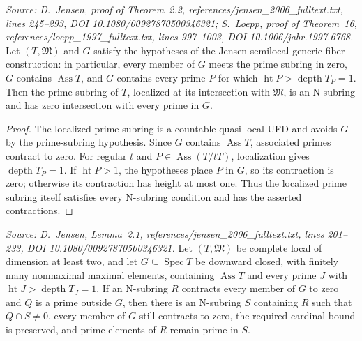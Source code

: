 \begin{lemma}
  \label{lem:initial_n_subring}
  \textit{Source: D.~Jensen, proof of Theorem~2.2,
  references/jensen\_2006\_fulltext.txt, lines 245--293,
  DOI 10.1080/00927870500346321; S.~Loepp, proof of Theorem~16,
  references/loepp\_1997\_fulltext.txt, lines 997--1003,
  DOI 10.1006/jabr.1997.6768.}
  Let \((T,\mathfrak M)\) and \(G\) satisfy the hypotheses of the Jensen
  semilocal generic-fiber construction: in particular, every member of
  \(G\) meets the prime subring in zero, \(G\) contains
  \(\operatorname{Ass}T\), and \(G\) contains every prime \(P\) for which
  \(\operatorname{ht}P>\operatorname{depth}T_P=1\).  Then the prime subring
  of \(T\), localized at its intersection with \(\mathfrak M\), is an
  N-subring and has zero intersection with every prime in \(G\).
\end{lemma}

\begin{proof}
  The localized prime subring is a countable quasi-local UFD and avoids
  \(G\) by the prime-subring hypothesis.  Since \(G\) contains
  \(\operatorname{Ass}T\), associated primes contract to zero.  For regular
  \(t\) and \(P\in\operatorname{Ass}(T/tT)\), localization gives
  \(\operatorname{depth}T_P=1\).  If \(\operatorname{ht}P>1\), the hypotheses
  place \(P\) in \(G\), so its contraction is zero; otherwise its contraction
  has height at most one.  Thus the localized prime subring itself satisfies
  every N-subring condition and has the asserted contractions.
\end{proof}

\begin{lemma}
  \label{lem:n_subring_prime_extension}
  \textit{Source: D.~Jensen, Lemma~2.1,
  references/jensen\_2006\_fulltext.txt, lines 201--233,
  DOI 10.1080/00927870500346321.}
  Let \((T,\mathfrak M)\) be complete local of dimension at least two, and let
  \(G\subseteq\operatorname{Spec}T\) be downward closed, with finitely
  many nonmaximal maximal elements, containing \(\operatorname{Ass}T\) and
  every prime \(J\) with
  \(\operatorname{ht}J>\operatorname{depth}T_J=1\).  If an N-subring \(R\)
  contracts every member of \(G\) to zero and \(Q\) is a prime outside
  \(G\), then there is
  an N-subring \(S\) containing \(R\) such that \(Q\cap S\neq0\), every
  member of \(G\) still contracts to zero, the required cardinal bound is
  preserved, and prime elements of \(R\) remain prime in \(S\).
\end{lemma}

